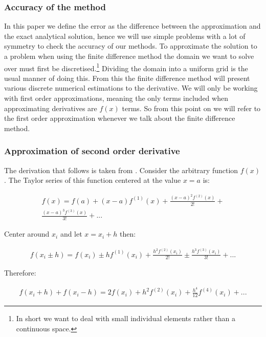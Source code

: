 \documentclass[aps,twocolumn,pre,nofootinbib,10pt]{revtex4-1}
\begin{document}
\subsubsection{Accuracy of the method}

\par\hspace{4mm} In this paper we define the error as the difference between the approximation and the exact analytical solution, hence we will use simple problems with a lot of symmetry to check the accuracy of our methods. To approximate the solution to a problem when using the finite difference method the domain we want to solve over must first be discretised.\footnote{In short we want to deal with small individual elements rather than a continuous space.} Dividing the domain into a uniform grid is the usual manner of doing this. From this the finite difference method will present various discrete numerical estimations to the derivative. We will only be working with first order approximations, meaning the only terms included when approximating derivatives are \(f(x)\) terms. So from this point on we will refer to the first order approximation whenever we talk about the finite difference method.

\subsubsection{Approximation of second order derivative}
The derivation that follows is taken from \cite{compmethods}. Consider the arbitrary function \(f(x)\). The Taylor series of this function centered at the value \(x=a\) is:

\begin{gather*}
f(x) = f(a) +(x-a)f^{(1)}(x)+\frac{(x-a)^{2}f^{(2)}(x)}{2!}+ \\
\frac{(x-a)^{3}f^{(3)}(x)}{3!}+...
\end{gather*}

Center around $x_i$ and let \(x=x_i + h\) then:

\begin{gather*}
f(x_i\pm h)=f(x_i) \pm hf^{(1)}(x_i)+\frac{h^2f^{(2)}(x_i)}{2!} \pm \frac{h^3f^{(3)}(x_i)}{3!}+...
\end{gather*}

Therefore:

\begin{gather*}
f(x_i+h)+f(x_i-h) = 2f(x_i) + h^2f^{(2)}(x_i) +\frac{h^4}{12}f^{(4)}(x_i)+...
\end{gather*}
\end{document}
